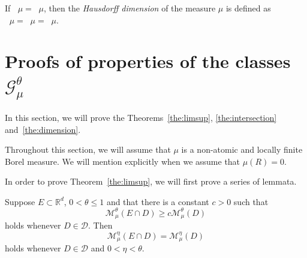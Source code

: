 \documentclass[AHL,Unicode,longabstracts]{cedram}
\DeclareMathOperator{\dimh}{dim_H}
\DeclareMathOperator{\ldimh}{\underline{dim}_H}
\DeclareMathOperator{\udimh}{\overline{dim}_H}
\newcommand*{\dimh}{\mathrm{dim}_{\mathrm{H}}}
\begin{document}
If $\ldimh \mu = \udimh \mu$, then the {\em Hausdorff dimension} of the measure $\mu$ is defined as $\dimh \mu = \ldimh \mu = \udimh \mu$.


\section{Proofs of properties of the classes \texorpdfstring{$\mathscr{G}_\mu^\theta$}{}} \label{sec:propertiesproofs}

In this section, we will prove the Theorems~\ref{the:limsup}, \ref{the:intersection} and~\ref{the:dimension}.

Throughout this section, we will assume that $\mu$ is a non-atomic and locally finite Borel measure. We will mention explicitly when we assume that $\mu (R) = 0$.

In order to prove Theorem~\ref{the:limsup}, we will first prove a series of lemmata.

\begin{lemm}\label{lem:removec}
Suppose $E \subset \mathbb{R}^d$, $0 < \theta \leq 1$ and that there is a constant $c > 0$ such that
\[
\mathscr{M}_\mu^\theta (E \cap D) \geq c \mathscr{M}_\mu^\theta (D)
\]
holds whenever $D \in \mathscr{D}$. Then
\[
\mathscr{M}_\mu^\eta (E \cap D) = \mathscr{M}_\mu^\eta (D)
\]
holds whenever $D \in \mathscr{D}$ and $0 < \eta < \theta$.
\end{lemm}
\end{document}
